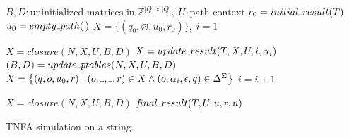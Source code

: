 \documentclass[AMA,STIX1COL]{WileyNJD-v2}
\newcommand{\Xund}{\rule{.4em}{.4pt}}
\newcommand{\YZ}{\mathbb{Z}}
\begin{document}
\begin{algorithm}[H] \DontPrintSemicolon {} \label{alg_match}
 {

    $B, D : \text{uninitialized matrices in } \YZ^{|Q| \times |Q|}, \; U: \text{path context}$ \;
    $r_0 = initial \Xund result(T)$ \;
    $u_0 = empty \Xund path(\,)$ \;
    $X = \big\{ (q_0, \varnothing, u_0, r_0) \big\}, \; i = 1$ \;

    \BlankLine
     {
        $X = closure(N, X, U, B, D)$ \;
        $X = update \Xund result(T, X, U, i, \alpha_i)$ \;
        $(B, D) = update \Xund ptables(N, X, U, B, D)$ \;
        $X = \big\{ (q, o, u_0, r) \mid (o, \Xund, \Xund, r) \in X \wedge (o, \alpha_i, \epsilon, q) \in \Delta^\Sigma \big\}$ \;
        $i = i + 1$ \;
    }

    \BlankLine
    $X = closure(N, X, U, B, D)$ \;
    \If {$(q_f, \Xund, u, r) \in X$} {
        \Return $f\!inal \Xund result (T, U, u, r, n)$
    } \lElse {
        \Return $\varnothing$
    }

    \BlankLine
}
\caption{TNFA simulation on a string.}
\end{algorithm}
\medskip
\end{document}
